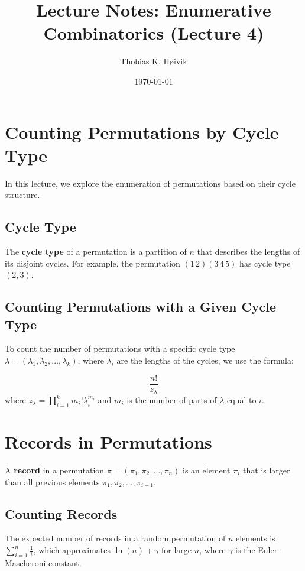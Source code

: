 \documentclass[12pt]{article}
\title{Lecture Notes: Enumerative Combinatorics (Lecture 4)}
\author{Thobias K. Høivik}
\date{\today}
\begin{document}
\maketitle

\section{Counting Permutations by Cycle Type}

In this lecture, we explore the enumeration of permutations based on their cycle structure.

\subsection{Cycle Type}

The \textbf{cycle type} of a permutation is a partition of \( n \) that describes the lengths of its disjoint cycles. For example, the permutation \( (1\,2)(3\,4\,5) \) has cycle type \( (2,3) \).

\subsection{Counting Permutations with a Given Cycle Type}

To count the number of permutations with a specific cycle type \( \lambda = (\lambda_1, \lambda_2, \ldots, \lambda_k) \), where \( \lambda_i \) are the lengths of the cycles, we use the formula:

\[
\frac{n!}{z_\lambda}
\]
where \( z_\lambda = \prod_{i=1}^k m_i! \lambda_i^{m_i} \) and \( m_i \) is the number of parts of \( \lambda \) equal to \( i \).

\section{Records in Permutations}

A \textbf{record} in a permutation \( \pi = (\pi_1, \pi_2, \ldots, \pi_n) \) is an element \( \pi_i \) that is larger than all previous elements \( \pi_1, \pi_2, \ldots, \pi_{i-1} \).

\subsection{Counting Records}

The expected number of records in a random permutation of \( n \) elements is \( \sum_{i=1}^n \frac{1}{i} \), which approximates \( \ln(n) + \gamma \) for large \( n \), where \( \gamma \) is the Euler-Mascheroni constant.
\end{document}
